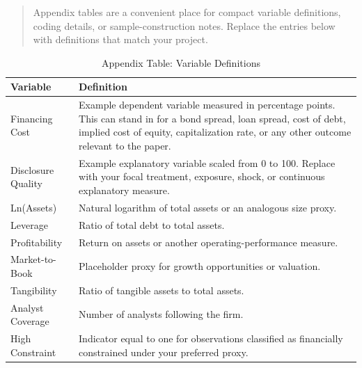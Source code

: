 \documentclass[hidelinks,12pt]{article}
\newcommand{\floatnotes}[1]{%
\begin{quotation}
\noindent \scriptsize #1
\end{quotation}
}
\begin{document}
\clearpage
\begin{table}[!htbp]
\centering
\caption{Appendix Table: Variable Definitions}
\label{tab:appendix_variables}\vspace{-2.5ex}
\floatnotes{Appendix tables are a convenient place for compact variable definitions, coding details, or sample-construction notes. Replace the entries below with definitions that match your project.}
\small
\begin{tabularx}{\textwidth}{@{}L{3.0cm}X@{}}
\toprule
\textbf{Variable} & \textbf{Definition} \\
\midrule
Financing Cost & Example dependent variable measured in percentage points. This can stand in for a bond spread, loan spread, cost of debt, implied cost of equity, capitalization rate, or any other outcome relevant to the paper. \\
Disclosure Quality & Example explanatory variable scaled from 0 to 100. Replace with your focal treatment, exposure, shock, or continuous explanatory measure. \\
Ln(Assets) & Natural logarithm of total assets or an analogous size proxy. \\
Leverage & Ratio of total debt to total assets. \\
Profitability & Return on assets or another operating-performance measure. \\
Market-to-Book & Placeholder proxy for growth opportunities or valuation. \\
Tangibility & Ratio of tangible assets to total assets. \\
Analyst Coverage & Number of analysts following the firm. \\
High Constraint & Indicator equal to one for observations classified as financially constrained under your preferred proxy. \\
\bottomrule
\end{tabularx}
\end{table}
\end{document}
